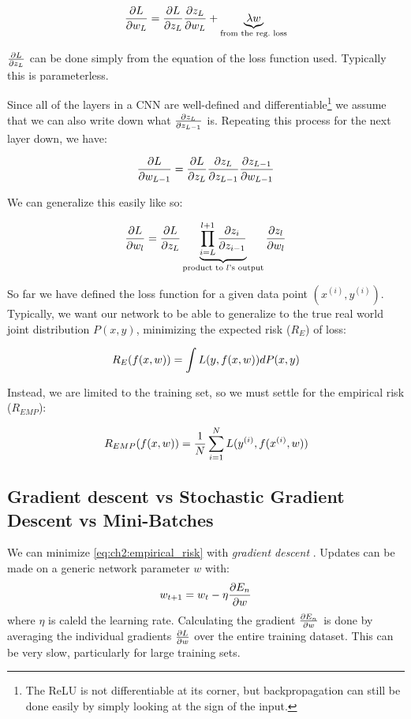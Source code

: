 \begin{equation}
  \frac{\partial L}{\partial w_L} = \frac{\partial L}{\partial z_L} \frac{\partial z_L}{\partial w_L} + \underbrace{\lambda
  w}_{\text{from the reg.\ loss}}
\end{equation}

$\frac{\partial L}{\partial z_L}$ can be done simply from the equation of the loss function
used. Typically this is parameterless.

Since all of the layers in a CNN are well-defined and
differentiable\footnote{The ReLU is not differentiable at its corner, but
backpropagation can still be done easily by simply looking at the sign of the
input.} we assume that we can also write down what $\frac{\partial z_L}{\partial z_{L-1}}$ is.
Repeating this process for the next layer down, we have:

\begin{equation}
  \frac{\partial L}{\partial w_{L-1}}
  = \frac{\partial L}{\partial z_L}\frac{\partial z_L}{\partial z_{L-1}}\frac{\partial z_{L-1}}{\partial w_{L-1}}
\end{equation}

We can generalize this easily like so:

\begin{equation}
  \frac{\partial L}{\partial w_{l}}
  = \frac{\partial L}{\partial z_L} \underbrace{\prod_{i=L}^{l+1}
  \frac{\partial z_i}{\partial z_{i-1}}}_{\text{product to $l$'s output}} 
  \frac{\partial z_{l}}{\partial w_{l}}
\end{equation}

So far we have defined the loss function for a given data point $(x^{(i)},
y^{(i)})$. Typically, we want our network to be able to generalize to the true
real world joint distribution $P(x,y)$, minimizing the expected risk ($R_E$) of
loss:

\begin{equation}
  R_E(f(x,w)) = \int L(y,f(x,w)) dP(x,y)
\end{equation}

Instead, we are limited to the training set, so we must settle for the
empirical risk ($R_{EMP}$):

\begin{equation}
  R_{EMP}(f(x,w)) = \frac{1}{N} \sum_{i=1}^{N} L( y^{(i)},f(x^{(i)}, w))
  \label{eq:ch2:empirical_risk}
\end{equation}

\subsection{Gradient descent vs Stochastic Gradient Descent vs Mini-Batches}
  We can minimize \eqref{eq:ch2:empirical_risk} with \emph{gradient descent}
  . Updates can be made on a generic network
  parameter $w$ with:
  \begin{equation}
    w_{t+1} = w_{t} - \eta \frac{\partial E_n}{\partial w}
  \end{equation}
  where $\eta$ is caleld the learning rate. Calculating the gradient
  $\frac{\partial E_n}{\partial w}$ is done by averaging the individual gradients
  $\frac{\partial L}{\partial w}$ over the entire training dataset. This can be very slow,
  particularly for large training sets.
